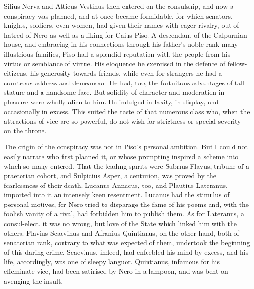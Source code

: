 
Silius Nerva and Atticus Vestinus then entered on the consulship, and now a conspiracy was planned, and at once became formidable, for which senators, knights, soldiers, even women, had given their names with eager rivalry, out of hatred of Nero as well as a liking for Caius Piso. A descendant of the Calpurnian house, and embracing in his connections through his father's noble rank many illustrious families, Piso had a splendid reputation with the people from his virtue or semblance of virtue. His eloquence he exercised in the defence of fellow-citizens, his generosity towards friends, while even for strangers he had a courteous address and demeanour. He had, too, the fortuitous advantages of tall stature and a handsome face. But solidity of character and moderation in pleasure were wholly alien to him. He indulged in laxity, in display, and occasionally in excess. This suited the taste of that numerous class who, when the attractions of vice are so powerful, do not wish for strictness or special severity on the throne.


The origin of the conspiracy was not in Piso's personal ambition. But I could not easily narrate who first planned it, or whose prompting inspired a scheme into which so many entered. That the leading spirits were Subrius Flavus, tribune of a praetorian cohort, and Sulpicius Asper, a centurion, was proved by the fearlessness of their death. Lucanus Annaeus, too, and Plautius Lateranus, imported into it an intensely keen resentment. Lucanus had the stimulus of personal motives, for Nero tried to disparage the fame of his poems and, with the foolish vanity of a rival, had forbidden him to publish them. As for Lateranus, a consul-elect, it was no wrong, but love of the State which linked him with the others. Flavius Scaevinus and Afranius Quintianus, on the other hand, both of senatorian rank, contrary to what was expected of them, undertook the beginning of this daring crime. Scaevinus, indeed, had enfeebled his mind by excess, and his life, accordingly, was one of sleepy languor. Quintianus, infamous for his effeminate vice, had been satirised by Nero in a lampoon, and was bent on avenging the insult.


